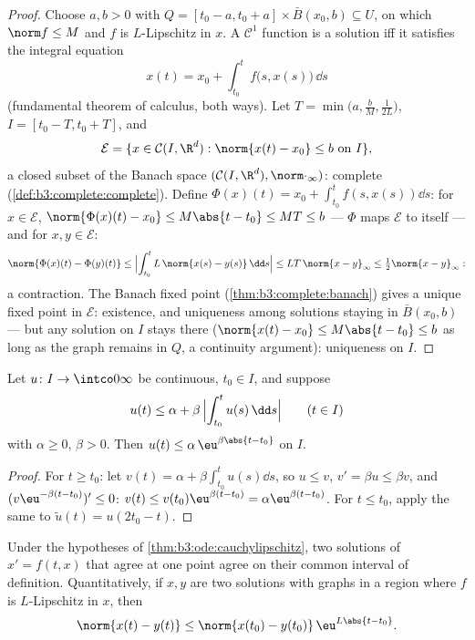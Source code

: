 \begin{proof}
Choose $a, b > 0$ with $Q = [t_0 - a, t_0 + a]\times\bar
B(x_0, b) \subseteq U$, on which $\norm f \leq M$ and $f$ is
$L$-Lipschitz in $x$. A $\mathcal C^1$ function is a solution
iff it satisfies the integral equation
\[
x(t) = x_0 + \int_{t_0}^{t}f\bigl(s, x(s)\bigr)\,\dd s
\]
(fundamental theorem of calculus, both ways). Let $T =
\min\bigl(a, \frac bM, \frac1{2L}\bigr)$, $I = [t_0 - T, t_0
+ T]$, and
\[
\mathcal E = \{x \in \mathcal C(I, \R^d) : \norm{x(t) - x_0}
\leq b\ \text{on } I\},
\]
a closed subset of the Banach space $(\mathcal C(I, \R^d),
\norm\cdot_\infty)$: complete
(\cref{def:b3:complete:complete}). Define $\Phi(x)(t) = x_0 +
\int_{t_0}^tf(s, x(s))\dd s$: for $x \in \mathcal E$,
$\norm{\Phi(x)(t) - x_0} \leq M\abs{t - t_0} \leq MT \leq b$
--- $\Phi$ maps $\mathcal E$ to itself --- and for $x, y \in
\mathcal E$:
\[
\norm{\Phi(x)(t) - \Phi(y)(t)} \leq \Bigl|\int_{t_0}^t
L\,\norm{x(s) - y(s)}\,\dd s\Bigr| \leq LT\,\norm{x -
y}_\infty \leq \tfrac12\norm{x - y}_\infty :
\]
a contraction. The Banach fixed point
(\cref{thm:b3:complete:banach}) gives a unique fixed point in
$\mathcal E$: existence, and uniqueness among solutions
staying in $\bar B(x_0, b)$ --- but any solution on $I$ stays
there ($\norm{x(t) - x_0} \leq M\abs{t - t_0} \leq b$ as long
as the graph remains in $Q$, a continuity argument):
uniqueness on $I$.
\end{proof}

\begin{lemma}[Gr\"onwall]\label{lem:b3:ode:gronwall}
Let $u \colon I \to \intco0\infty$ be continuous, $t_0 \in
I$, and suppose
\[
u(t) \leq \alpha + \beta\,\Bigl|\int_{t_0}^{t}u(s)\,\dd
s\Bigr| \qquad (t \in I)
\]
with $\alpha \geq 0$, $\beta > 0$. Then $u(t) \leq
\alpha\,\eu^{\beta\abs{t - t_0}}$ on $I$.
\end{lemma}

\begin{proof}
For $t \geq t_0$: let $v(t) = \alpha +
\beta\int_{t_0}^tu(s)\dd s$, so $u \leq v$, $v' = \beta u
\leq \beta v$, and $(v\eu^{-\beta(t - t_0)})' \leq 0$: $v(t)
\leq v(t_0)\eu^{\beta(t-t_0)} = \alpha\eu^{\beta(t - t_0)}$.
For $t \leq t_0$, apply the same to $\tilde u(t) = u(2t_0 -
t)$.
\end{proof}

\begin{corollary}
\label{cor:b3:ode:uniqueness}
Under the hypotheses of \cref{thm:b3:ode:cauchylipschitz},
two solutions of $x' = f(t,x)$ that agree at one point agree
on their common interval of definition. Quantitatively, if
$x, y$ are two solutions with graphs in a region where $f$ is
$L$-Lipschitz in $x$, then
\[
\norm{x(t) - y(t)} \leq \norm{x(t_0) -
y(t_0)}\,\eu^{L\abs{t - t_0}} .
\]
\end{corollary}

